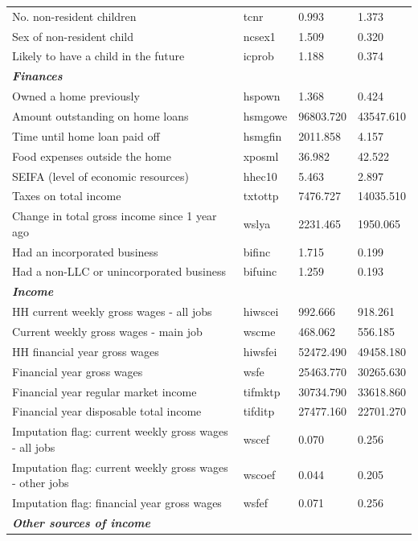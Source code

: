 \documentclass[12pt, a4paper]{article}
\begin{document}
\begin{landscape}
\begin{longtable}{p{} C{0.2\textwidth} C{0.2\textwidth} C{0.2\textwidth}}
No.  non-resident children 	& 	tcnr	 & 	0.993	 & 	1.373	 \\
Sex of non-resident child 	& 	ncsex1	 & 	1.509	 & 	0.320	 \\
Likely to have a child in the future 	& 	icprob	 & 	1.188	 & 	0.374	 \\
\textbf{\textit{Finances}} 	& 		 & 		 & 		 \\
Owned a home previously 	& 	hspown	 & 	1.368	 & 	0.424	 \\
Amount outstanding on home loans 	& 	hsmgowe	 & 	96803.720	 & 	43547.610	 \\
Time until home loan paid off	& 	hsmgfin	 & 	2011.858	 & 	4.157	 \\
Food expenses outside the home 	& 	xposml	 & 	36.982	 & 	42.522	 \\
SEIFA (level of economic resources) 	& 	hhec10	 & 	5.463	 & 	2.897	 \\
Taxes on total income 	& 	txtottp	 & 	7476.727	 & 	14035.510	 \\
Change in total gross income since 1 year ago 	& 	wslya	 & 	2231.465	 & 	1950.065	 \\
Had an incorporated business 	& 	bifinc	 & 	1.715	 & 	0.199	 \\
Had a non-LLC or unincorporated business 	& 	bifuinc	 & 	1.259	 & 	0.193	 \\
\textbf{\textit{Income}} 	& 		 & 		 & 		 \\
HH current weekly gross wages - all jobs 	& 	hiwscei	 & 	992.666	 & 	918.261	 \\
Current weekly gross wages - main job 	& 	wscme	 & 	468.062	 & 	556.185	 \\
HH financial year gross wages 	& 	hiwsfei	 & 	52472.490	 & 	49458.180	 \\
Financial year gross wages 	& 	wsfe	 & 	25463.770	 & 	30265.630	 \\
Financial year regular market income	& 	tifmktp	 & 	30734.790	 & 	33618.860	 \\
Financial year disposable total income 	& 	tifditp	 & 	27477.160	 & 	22701.270	 \\
Imputation flag: current weekly gross wages - all jobs 	& 	wscef	 & 	0.070	 & 	0.256	 \\
Imputation flag: current weekly gross wages - other jobs 	& 	wscoef	 & 	0.044	 & 	0.205	 \\
Imputation flag: financial year gross wages 	& 	wsfef	 & 	0.071	 & 	0.256	 \\
\textbf{\textit{Other sources of income}} 	& 		 & 		 & 		 \\

\end{longtable}
\end{landscape}
\end{document}
